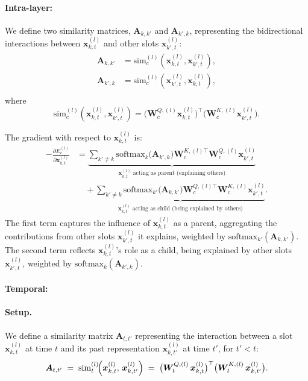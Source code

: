 \documentclass{article}
\begin{document}
\paragraph{Intra-layer:}

We define two similarity matrices, \(\bm{A}_{k,k'}\) and \(\bm{A}_{k',k}\), representing the bidirectional interactions between \(\bm{x}_{k,t}^{(l)}\) and other slots \(\bm{x}_{k',t}^{(l)}\):
\begin{equation}
\begin{aligned}
\bm{A}_{k,k'} &= \mathrm{sim}_{c}^{(l)}(\bm{x}_{k,t}^{(l)}, \bm{x}_{k',t}^{(l)}), \\
\bm{A}_{k',k} &= \mathrm{sim}_{c}^{(l)}(\bm{x}_{k',t}^{(l)}, \bm{x}_{k,t}^{(l)}), \\
\end{aligned}
\end{equation}
where 
\[
\mathrm{sim}_{c}^{(l)}(\bm{x}_{k,t}^{(l)}, \bm{x}_{k',t}^{(l)}) 
= \bigl(\bm{W}_{c}^{Q,(l)} \bm{x}_{k,t}^{(l)}\bigr)^\top \bigl(\bm{W}_{c}^{K,(l)} \bm{x}_{k',t}^{(l)}\bigr).
\]

The gradient with respect to \(\bm{x}_{k,t}^{(l)}\) is:
\begin{equation}
\begin{aligned}
-\frac{\partial E_{c}^{(l)}}{\partial \bm{x}_{k,t}^{(l)}}
&=
\underbrace{
\sum_{k'\neq k}
\mathrm{softmax}_{k}\bigl(\bm{A}_{k',k}\bigr)
\bm{W}_{c}^{K,(l)\top} \bm{W}_{c}^{Q,(l)} \bm{x}_{k',t}^{(l)}
}_{\text{\(\bm{x}_{k,t}^{(l)}\) acting as parent (explaining others)}} 
\\
&\quad +
\underbrace{
\sum_{k'\neq k}
\mathrm{softmax}_{k'}\bigl(\bm{A}_{k, k'}\bigr)
\bm{W}_{c}^{Q,(l)\top} \bm{W}_{c}^{K,(l)} \bm{x}_{k',t}^{(l)}
}_{\text{\(\bm{x}_{k,t}^{(l)}\) acting as child (being explained by others)}}.
\end{aligned}
\end{equation}
The first term captures the influence of \(\bm{x}_{k,t}^{(l)}\) as a parent, aggregating the contributions from other slots \(\bm{x}_{k',t}^{(l)}\) it explains, weighted by \(\mathrm{softmax}_{k'}(\bm{A}_{k,k'})\). The second term reflects \(\bm{x}_{k,t}^{(l)}\)'s role as a child, being explained by other slots \(\bm{x}_{k',t}^{(l)}\), weighted by \(\mathrm{softmax}_{k}(\bm{A}_{k',k})\).


\paragraph{Temporal:}

\paragraph{Setup.}
We define a similarity matrix \(\bm{A}_{t,t'}\) representing the interaction between a slot \(\bm{x}_{k,t}^{(l)}\) at time \(t\) and its past representation \(\bm{x}_{k,t'}^{(l)}\) at time \(t'\), for \(t'<t\):
\begin{equation}
\bm{A}_{t,t'} \;=\;
\mathrm{sim}_{t}^{(l)}\!\Bigl(\bm{x}_{k,t}^{(l)},\,\bm{x}_{k,t'}^{(l)}\Bigr)
\;=\;
\bigl(\bm{W}_{t}^{Q,(l)}\,\bm{x}_{k,t}^{(l)}\bigr)^\top
\bigl(\bm{W}_{t}^{K,(l)}\,\bm{x}_{k,t'}^{(l)}\bigr).
\end{equation}
\end{document}
